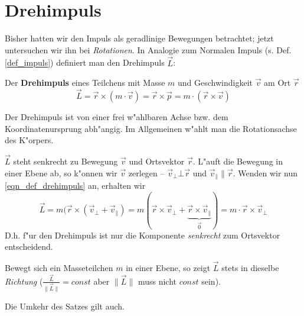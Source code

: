 \section{Drehimpuls}
\label{kap_drehimpuls}



Bisher hatten wir den Impuls als geradlinige Bewegungen betrachtet;
jetzt untersuchen wir ihn bei \emph{Rotationen}. In Analogie zum
Normalen Impuls (s. Def. \ref{def_impuls}) definiert man den
Drehimpuls $\Vec L$:

\begin{Def}[Drehimpuls]
   \label{def_drehimpuls} Der
   \textbf{Drehimpuls} eines Teilchens mit Masse $m$ und
   Geschwindigkeit $\Vec v$ am Ort $\Vec r$
   \begin{equation}
      \label{eqn_def_drehimpuls}
      \Vec L = \Vec r \times (m \cdot \Vec v) 
       = \Vec r \times \Vec p 
        = m \cdot (\Vec r \times \Vec v)
   \end{equation}
\end{Def}

Der Drehimpuls ist von einer frei w"ahlbaren Achse bzw. dem
Koordinatenursprung abh"angig. Im Allgemeinen w"ahlt man die
Rotationsachse des K"orpers.  


$\Vec L$ steht senkrecht zu Bewegung $\Vec v$ und Ortsvektor $\Vec
r$. L"auft die Bewegung in einer Ebene ab, so k"onnen wir $\Vec v$
zerlegen -- $\vec v_\bot \bot \Vec r$ und $\vec v_\| \| \vec
r$. Wenden wir nun \eqref{eqn_def_drehimpuls} an, erhalten wir
\begin{equation}
   \label{eqn_differenz-c7}
   \Vec L = m ( \vec r \times (\vec v_\bot + \vec v_\|) = 
 m ( \vec r \times \vec v_\bot + \underbrace{\vec r \times \vec
   v_\|}_{\vec 0}) = m \cdot \vec r \times \vec v_\bot
\end{equation}
D.h. f"ur den Drehimpuls ist nur die Komponente \emph{senkrecht} zum
Ortsvektor entscheidend.

\begin{Wichtig}
   Bewegt sich ein Masseteilchen $m$ in einer Ebene, so zeigt $\Vec L$ stets in dieselbe \emph{Richtung} ($\frac{\Vec L}{\|\Vec L\|} = const$ aber
   $\|\Vec L\|$ muss nicht $const$ sein). 
\end{Wichtig}
Die Umkehr des Satzes gilt auch.



